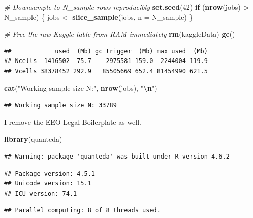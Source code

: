 \documentclass[
]{article}
\newenvironment{Shaded}{\begin{snugshade}}{\end{snugshade}}
\newcommand{\AttributeTok}[1]{\textcolor[rgb]{0.13,0.29,0.53}{#1}}
\newcommand{\CommentTok}[1]{\textcolor[rgb]{0.56,0.35,0.01}{\textit{#1}}}
\newcommand{\ControlFlowTok}[1]{\textcolor[rgb]{0.13,0.29,0.53}{\textbf{#1}}}
\newcommand{\DecValTok}[1]{\textcolor[rgb]{0.00,0.00,0.81}{#1}}
\newcommand{\FunctionTok}[1]{\textcolor[rgb]{0.13,0.29,0.53}{\textbf{#1}}}
\newcommand{\NormalTok}[1]{#1}
\newcommand{\OtherTok}[1]{\textcolor[rgb]{0.56,0.35,0.01}{#1}}
\newcommand{\SpecialCharTok}[1]{\textcolor[rgb]{0.81,0.36,0.00}{\textbf{#1}}}
\newcommand{\StringTok}[1]{\textcolor[rgb]{0.31,0.60,0.02}{#1}}
\begin{document}
\begin{Shaded}
\begin{Highlighting}[]
\CommentTok{\# Downsample to N\_sample rows reproducibly}
\FunctionTok{set.seed}\NormalTok{(}\DecValTok{42}\NormalTok{)}
\ControlFlowTok{if}\NormalTok{ (}\FunctionTok{nrow}\NormalTok{(jobs) }\SpecialCharTok{\textgreater{}}\NormalTok{ N\_sample) \{}
\NormalTok{  jobs }\OtherTok{\textless{}{-}} \FunctionTok{slice\_sample}\NormalTok{(jobs, }\AttributeTok{n =}\NormalTok{ N\_sample)}
\NormalTok{\}}

\CommentTok{\# Free the raw Kaggle table from RAM immediately}
\FunctionTok{rm}\NormalTok{(kaggleData)}
\FunctionTok{gc}\NormalTok{()}
\end{Highlighting}
\end{Shaded}

\begin{verbatim}
##            used  (Mb) gc trigger  (Mb) max used  (Mb)
## Ncells  1416502  75.7    2975581 159.0  2244004 119.9
## Vcells 38378452 292.9   85505669 652.4 81454990 621.5
\end{verbatim}

\begin{Shaded}
\begin{Highlighting}[]
\FunctionTok{cat}\NormalTok{(}\StringTok{"Working sample size N:"}\NormalTok{, }\FunctionTok{nrow}\NormalTok{(jobs), }\StringTok{"}\SpecialCharTok{\textbackslash{}n}\StringTok{"}\NormalTok{)}
\end{Highlighting}
\end{Shaded}

\begin{verbatim}
## Working sample size N: 33789
\end{verbatim}

I remove the EEO Legal Boilerplate as well.

\begin{Shaded}
\begin{Highlighting}[]
\FunctionTok{library}\NormalTok{(quanteda)}
\end{Highlighting}
\end{Shaded}

\begin{verbatim}
## Warning: package 'quanteda' was built under R version 4.6.2
\end{verbatim}

\begin{verbatim}
## Package version: 4.5.1
## Unicode version: 15.1
## ICU version: 74.1
\end{verbatim}

\begin{verbatim}
## Parallel computing: 8 of 8 threads used.
\end{verbatim}
\end{document}
